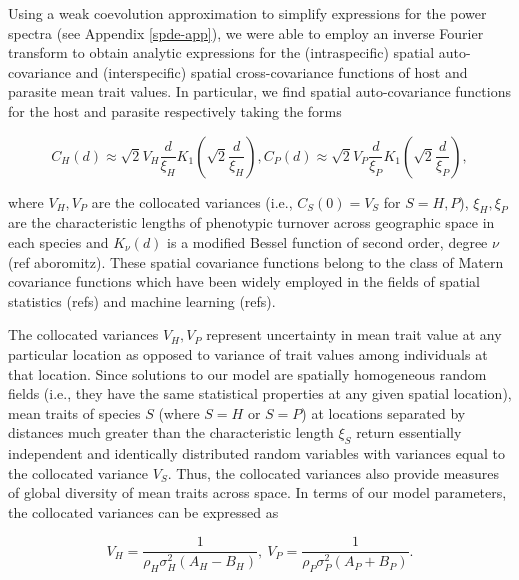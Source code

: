 \documentclass{article}
\begin{document}
Using a weak coevolution approximation to simplify expressions for the
power spectra (see Appendix \ref{spde-app}), we were able to employ an
inverse Fourier transform to obtain analytic expressions for the
(intraspecific) spatial auto-covariance and (interspecific) spatial
cross-covariance functions of host and parasite mean trait values. In
particular, we find spatial auto-covariance functions for the host and
parasite respectively taking the forms

\begin{subequations}
  \begin{equation}
    C_H(d)\approx\sqrt2V_H\frac{d}{\xi_H}K_1\left(\sqrt2\frac{d}{\xi_H}\right),
  \end{equation}
  \begin{equation}
    C_P(d)\approx\sqrt2V_P\frac{d}{\xi_P}K_1\left(\sqrt2\frac{d}{\xi_P}\right),
  \end{equation}
\end{subequations}

where \(V_H,V_P\) are the collocated variances (i.e., \(C_S(0)=V_S\) for
\(S=H,P\)), \(\xi_H,\xi_P\) are the characteristic lengths of phenotypic
turnover across geographic space in each species and \(K_\nu(d)\) is a
modified Bessel function of second order, degree \(\nu\) (ref
aboromitz). These spatial covariance functions belong to the class of
Matern covariance functions which have been widely employed in the
fields of spatial statistics (refs) and machine learning (refs).

The collocated variances \(V_H,V_P\) represent uncertainty in mean trait
value at any particular location as opposed to variance of trait values
among individuals at that location. Since solutions to our model are
spatially homogeneous random fields (i.e., they have the same
statistical properties at any given spatial location), mean traits of
species \(S\) (where \(S=H\) or \(S=P\)) at locations separated by
distances much greater than the characteristic length \(\xi_S\) return
essentially independent and identically distributed random variables
with variances equal to the collocated variance \(V_S\). Thus, the
collocated variances also provide measures of global diversity of mean
traits across space. In terms of our model parameters, the collocated
variances can be expressed as

\begin{equation}
  V_H = \frac{1}{\rho_H\sigma_H^2(A_H-B_H)}, \ V_P = \frac{1}{\rho_P\sigma_P^2(A_P+B_P)}.
\end{equation}
\end{document}
